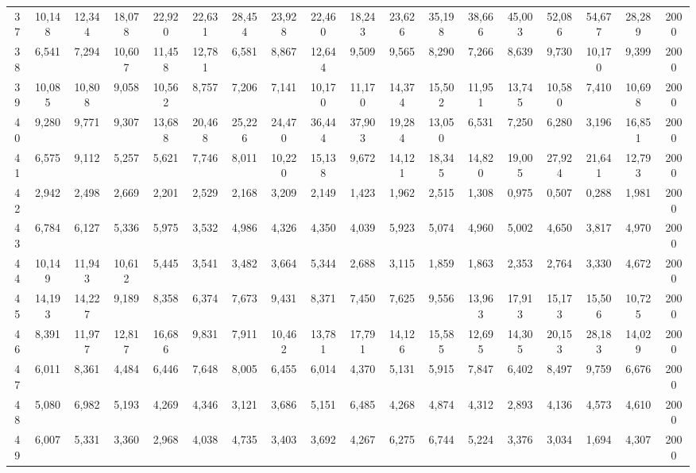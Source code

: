 {\begin{longtable}{ >{\tiny}cccccccccccccccccc}
37  & 10,148 & 12,344 & 18,078 & 22,920 & 22,631 & 28,454 & 23,928 & 22,460 & 18,243 & 23,626 & 35,198 & 38,666 & 45,003  & 52,086  & 54,677  & 28,289 & 2000 \\
38  & 6,541  & 7,294  & 10,607 & 11,458 & 12,781 & 6,581  & 8,867  & 12,644 & 9,509  & 9,565  & 8,290  & 7,266  & 8,639   & 9,730   & 10,170  & 9,399  & 2000 \\
39  & 10,085 & 10,808 & 9,058  & 10,562 & 8,757  & 7,206  & 7,141  & 10,170 & 11,170 & 14,374 & 15,502 & 11,951 & 13,745  & 10,580  & 7,410   & 10,698 & 2000 \\
40  & 9,280  & 9,771  & 9,307  & 13,688 & 20,468 & 25,226 & 24,470 & 36,444 & 37,903 & 19,284 & 13,050 & 6,531  & 7,250   & 6,280   & 3,196   & 16,851 & 2000 \\
41  & 6,575  & 9,112  & 5,257  & 5,621  & 7,746  & 8,011  & 10,220 & 15,138 & 9,672  & 14,121 & 18,345 & 14,820 & 19,005  & 27,924  & 21,641  & 12,793 & 2000 \\
42  & 2,942  & 2,498  & 2,669  & 2,201  & 2,529  & 2,168  & 3,209  & 2,149  & 1,423  & 1,962  & 2,515  & 1,308  & 0,975   & 0,507   & 0,288   & 1,981  & 2000 \\
43  & 6,784  & 6,127  & 5,336  & 5,975  & 3,532  & 4,986  & 4,326  & 4,350  & 4,039  & 5,923  & 5,074  & 4,960  & 5,002   & 4,650   & 3,817   & 4,970  & 2000 \\
44  & 10,149 & 11,943 & 10,612 & 5,445  & 3,541  & 3,482  & 3,664  & 5,344  & 2,688  & 3,115  & 1,859  & 1,863  & 2,353   & 2,764   & 3,330   & 4,672  & 2000 \\
45  & 14,193 & 14,227 & 9,189  & 8,358  & 6,374  & 7,673  & 9,431  & 8,371  & 7,450  & 7,625  & 9,556  & 13,963 & 17,913  & 15,173  & 15,506  & 10,725 & 2000 \\
46  & 8,391  & 11,977 & 12,817 & 16,686 & 9,831  & 7,911  & 10,462 & 13,781 & 17,791 & 14,126 & 15,585 & 12,695 & 14,305  & 20,153  & 28,183  & 14,029 & 2000 \\
47  & 6,011  & 8,361  & 4,484  & 6,446  & 7,648  & 8,005  & 6,455  & 6,014  & 4,370  & 5,131  & 5,915  & 7,847  & 6,402   & 8,497   & 9,759   & 6,676  & 2000 \\
48  & 5,080  & 6,982  & 5,193  & 4,269  & 4,346  & 3,121  & 3,686  & 5,151  & 6,485  & 4,268  & 4,874  & 4,312  & 2,893   & 4,136   & 4,573   & 4,610  & 2000 \\
49  & 6,007  & 5,331  & 3,360  & 2,968  & 4,038  & 4,735  & 3,403  & 3,692  & 4,267  & 6,275  & 6,744  & 5,224  & 3,376   & 3,034   & 1,694   & 4,307  & 2000 \\

\end{longtable}}
